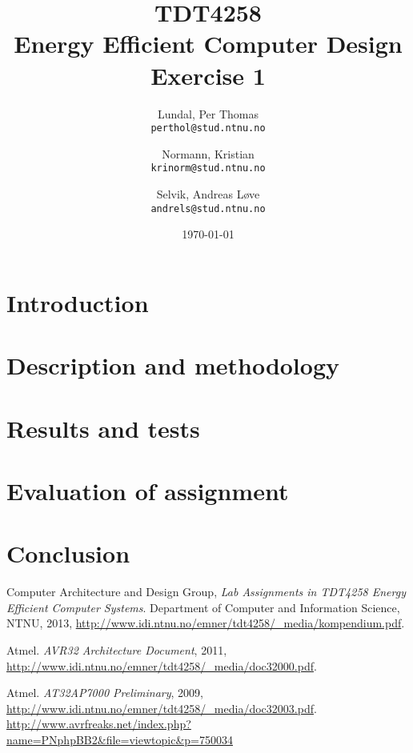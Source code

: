 \documentclass[a4paper,12pt]{article}
\title{TDT4258\\ Energy Efficient Computer Design
	\\Exercise 1}
\author{
    Lundal, Per Thomas\\
    \texttt{perthol@stud.ntnu.no}
    \and
    Normann, Kristian\\
    \texttt{krinorm@stud.ntnu.no}
    \and
    Selvik, Andreas Løve\\
    \texttt{andrels@stud.ntnu.no}
}
\date{\today}
\begin{document}
\maketitle

\clearpage
\begin{abstract}
    

\end{abstract}

\clearpage
\tableofcontents

\clearpage
\section{ Introduction}
    

\clearpage
\section{ Description and methodology}
    

\clearpage
\section{ Results and tests}
    

\clearpage
\section{ Evaluation of assignment}
    

\clearpage
\section{ Conclusion}
    

\clearpage

\begin{thebibliography}{9}

  Computer Architecture and Design Group,
  \emph{Lab Assignments in TDT4258 Energy Efficient
Computer Systems}.
  Department of Computer and Information Science, NTNU,
  2013,
  \url{http://www.idi.ntnu.no/emner/tdt4258/\_media/kompendium.pdf}.

  Atmel.
  \emph{AVR32 Architecture Document},
  2011,
  \url{http://www.idi.ntnu.no/emner/tdt4258/\_media/doc32000.pdf}.

  Atmel.
  \emph{AT32AP7000 Preliminary},
  2009,
  \url{http://www.idi.ntnu.no/emner/tdt4258/\_media/doc32003.pdf}.
  \url{http://www.avrfreaks.net/index.php?name=PNphpBB2&file=viewtopic&p=750034}

\end{thebibliography}
\end{document}
